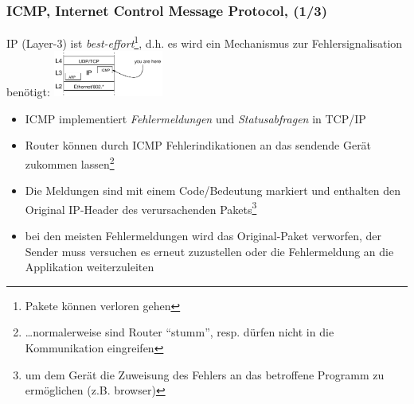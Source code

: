 \documentclass{beamer}
\begin{document}
\begin{frame}
\frametitle{ICMP, Internet Control Message Protocol, (1/3)}
IP (Layer-3) ist {\em best-effort}{}\footnote{Pakete k\"onnen verloren gehen}, d.h. es wird ein Mechanismus zur Fehlersignalisation ben\"otigt: \includegraphics[height=1.5cm]{icmp-layer}
\begin{itemize}
  \item{ICMP implementiert {\em Fehlermeldungen} und {\em Statusabfragen} in TCP/IP}
  \item{Router k\"onnen durch ICMP Fehlerindikationen an das sendende Ger\"at zukommen lassen\footnote{\ldots normalerweise sind Router ``stumm'', resp. d\"urfen nicht in die Kommunikation eingreifen}}
  \item{Die Meldungen sind mit einem Code/Bedeutung markiert und enthalten den Original IP-Header des verursachenden Pakets\footnote{um dem Ger\"at die Zuweisung des Fehlers an das betroffene Programm zu erm\"oglichen (z.B. browser)}}
  \item{bei den meisten Fehlermeldungen wird das Original-Paket verworfen, der Sender muss versuchen es erneut zuzustellen oder die Fehlermeldung an die Applikation weiterzuleiten}
\end{itemize}
\end{frame}
\end{document}
